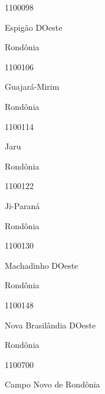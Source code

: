 \documentclass[
  letterpaper,
]{report}
\begin{document}
1100098

\n      

Espigão D\textquotesingle Oeste

\n    

\n    

\n      

Rondônia

\n      

1100106

\n      

Guajará-Mirim

\n    

\n    

\n      

Rondônia

\n      

1100114

\n      

Jaru

\n    

\n    

\n      

Rondônia

\n      

1100122

\n      

Ji-Paraná

\n    

\n    

\n      

Rondônia

\n      

1100130

\n      

Machadinho D\textquotesingle Oeste

\n    

\n    

\n      

Rondônia

\n      

1100148

\n      

Nova Brasilândia D\textquotesingle Oeste

\n    

\n    

\n      

Rondônia

\n      

1100700

\n      

Campo Novo de Rondônia
\end{document}
